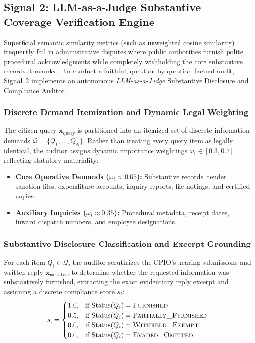 \documentclass[conference]{IEEEtran}
\begin{document}
\subsection{Signal 2: LLM-as-a-Judge Substantive Coverage Verification Engine}
Superficial semantic similarity metrics (such as unweighted cosine similarity) frequently fail in administrative disputes where public authorities furnish polite procedural acknowledgments while completely withholding the core substantive records demanded. To conduct a faithful, question-by-question factual audit, Signal~2 implements an autonomous \textit{LLM-as-a-Judge} Substantive Disclosure and Compliance Auditor \cite{zheng2023judging}.

\subsubsection{Discrete Demand Itemization and Dynamic Legal Weighting}
The citizen query $\mathbf{x}_{\text{query}}$ is partitioned into an itemized set of discrete information demands $\mathcal{Q} = \{Q_1, \dots, Q_N\}$. Rather than treating every query item as legally identical, the auditor assigns dynamic importance weightings $\omega_i \in [0.3, 0.7]$ reflecting statutory materiality:
\begin{itemize}
    \setlength{\itemsep}{1pt}\setlength{\parskip}{0pt}\setlength{\parsep}{0pt}
    \item \textbf{Core Operative Demands ($\omega_i \approx 0.65$):} Substantive records, tender sanction files, expenditure accounts, inquiry reports, file notings, and certified copies.
    \item \textbf{Auxiliary Inquiries ($\omega_i \approx 0.35$):} Procedural metadata, receipt dates, inward dispatch numbers, and employee designations.
\end{itemize}

\subsubsection{Substantive Disclosure Classification and Excerpt Grounding}
For each item $Q_i \in \mathcal{Q}$, the auditor scrutinizes the CPIO's hearing submissions and written reply $\mathbf{x}_{\text{narrative}}$ to determine whether the requested information was substantively furnished, extracting the exact evidentiary reply excerpt and assigning a discrete compliance score $s_i$:
\begin{equation}
s_i = \begin{cases}
1.0, & \text{if } \text{Status}(Q_i) = \textsc{Furnished} \\
0.5, & \text{if } \text{Status}(Q_i) = \textsc{Partially\_Furnished} \\
0.0, & \text{if } \text{Status}(Q_i) = \textsc{Withheld\_Exempt} \\
0.0, & \text{if } \text{Status}(Q_i) = \textsc{Evaded\_Omitted}
\end{cases}
\end{equation}
\end{document}
